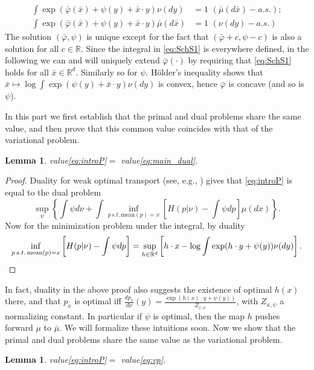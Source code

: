 \documentclass[reqno, a4paper]{amsart}
\theoremstyle{plain}
\newtheorem{lemma}[theorem]{Lemma}
\theoremstyle{definition}
\theoremstyle{remark}
\numberwithin{equation}{section}
\numberwithin{theorem}{section}
\newcommand{\R}{\mathbb{R}}
\newcommand{\Rd}{\mathbb{R}^{d}}
\begin{document}
	\begin{align}\label{eq:SchS1}\tag{SS1}
		\int \exp( \bar\varphi(\bar x) + \psi(y) +\bar x\cdot y) \nu(dy)&=1 \,\,(\bar\mu(d\bar x)-a.s.);\\
		\int \exp(\bar\varphi(\bar x) + \psi(y) + \bar x\cdot y) \bar\mu(d\bar x)&=1 \,\,(\nu(d y)-a.s.) \label{eq:SchS2}\tag{SS2}
	\end{align}
	The solution $(\bar\varphi,\psi)$ is unique except for the fact that $(\bar\varphi + c,\psi -c)$ is also a solution for all $c \in \R$. 
	Since the integral in \eqref{eq:SchS1} is everywhere defined, in the following we can and will uniquely extend $\bar\varphi(\cdot)$ by requiring that \eqref{eq:SchS1} holds for all $\bar x\in\Rd$. Similarly so for $\psi$. H\"older's inequality shows that $\bar x\mapsto\log \int \exp(\psi(y) + \bar x\cdot y) \nu(dy)$ is convex, hence $\bar\varphi$ is concave (and so is $\psi$).
	
	
	In this part we first establish that the primal and dual problems share the same value, and then prove that this common value coincides with that of the variational problem.
	
	\begin{lemma}\label{lem:V_D_eq}
		value\eqref{eq:introP}$=$ value\eqref{eq:main_dual}.
	\end{lemma}
	
	\begin{proof}
		Duality for weak optimal transport (see, e.g., \cite{BaBePa18}) gives that \eqref{eq:introP} is equal to the dual problem
		$$\sup_\psi\left\{\int\psi d\nu + \int \inf_{p\, s.t.\, \text{mean}(p)=x}\left [ H(p|\nu) -\int\psi dp \right]\mu(dx)\right\}.$$
		Now for the minimization problem under the integral, by duality  $$\inf_{p\, s.t.\, \text{mean}(p)=x}\left [ H(p|\nu) -\int\psi dp \right]=\sup_{h\in\Rd}\left[h\cdot x-\log\int \exp(h\cdot y +\psi(y))\nu(dy) \right].\qedhere$$
	\end{proof}
	
	In fact, duality in the above proof also suggests the existence of optimal $h(x)$ there, and that $p_x$ is optimal iff $\frac{dp_x}{d\nu}(y)=\frac{\exp(h(x)\cdot y + \psi(y))}{Z_{x,\psi}}$, with $Z_{x,\psi}$ a normalizing constant. In particular if $\psi$ is optimal, then the map $h$ pushes forward $\mu$ to $\bar\mu$. We will formalize these intuitions soon. Now we show that the primal and dual problems share the same value as the variational problem.
	
	\begin{lemma}\label{lem:P_VP_eq}
		value\eqref{eq:introP}$= $ value\eqref{eq:vp}.
	\end{lemma}
	
\end{document}

